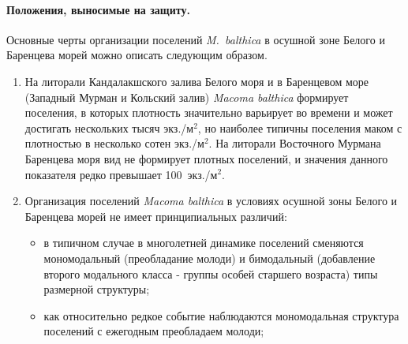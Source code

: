 \paragraph{Положения, выносимые на защиту.}
Основные черты организации поселений \textit{M.~balthica} в осушной зоне Белого и Баренцева морей можно описать следующим образом.
\begin{enumerate}
\item %
На литорали Кандалакшского залива Белого моря и в Баренцевом море (Западный Мурман и Кольский залив) \textit{Macoma balthica} формирует поселения, в которых плотность значительно варьирует во времени и может достигать нескольких тысяч экз./м$^2$, но наиболее типичны поселения маком с плотностью в несколько сотен экз./м$^2$. 
На литорали Восточного Мурмана Баренцева моря вид не формирует плотных поселений, и значения данного показателя редко превышает 100~экз./м$^2$.

\item Организация поселений  \textit{Macoma balthica} в условиях осушной зоны Белого и Баренцева морей не имеет принципиальных различий:
	\begin{itemize}
		\item  в типичном случае в многолетней динамике поселений сменяются мономодальный (преобладание молоди) и бимодальный (добавление второго модального класса - группы особей старшего возраста) типы размерной структуры; 
		\item как относительно редкое событие наблюдаются мономодальная структура поселений с ежегодным преобладаем молоди;
	\end{itemize}


\end{enumerate}
